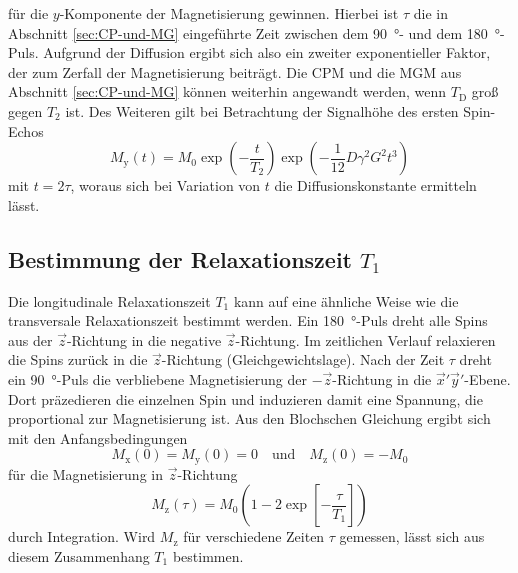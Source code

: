 für die $y$-Komponente der Magnetisierung gewinnen.
Hierbei ist $\tau$ die in Abschnitt \ref{sec:CP-und-MG} eingeführte Zeit zwischen
dem \SI{90}{\degree}- und dem \SI{180}{\degree}-Puls.
Aufgrund der Diffusion ergibt sich also ein zweiter exponentieller Faktor, der
zum Zerfall der Magnetisierung beiträgt.
Die CPM und die MGM aus Abschnitt \ref{sec:CP-und-MG} können weiterhin
angewandt werden, wenn $T_\text{D}$ groß gegen $T_2$ ist.
Des Weiteren gilt bei Betrachtung der Signalhöhe des ersten Spin-Echos
\begin{equation}
  M_\text{y}\!\left(t\right) = M_0
  \exp\!\left(-\frac{t}{T_2}\right)
  \exp\!\left(-\frac{1}{12} D \gamma^2 G^2 t^3\right)
  \label{eqn:DiffusionsBestimmung}
\end{equation}
mit $t = 2\tau$,
woraus sich bei Variation von $t$ die Diffusionskonstante ermitteln lässt.


\subsection{Bestimmung der Relaxationszeit \texorpdfstring{$T_1$}{T1}}
\label{sec:T1Theo}

Die longitudinale Relaxationszeit $T_1$ kann auf eine ähnliche Weise wie die
transversale Relaxationszeit bestimmt werden.
Ein \SI{180}{\degree}-Puls dreht alle Spins aus der $\vec{z}$-Richtung in
die negative $\vec{z}$-Richtung. Im zeitlichen Verlauf relaxieren die Spins zurück
in die $\vec{z}$-Richtung (Gleichgewichtslage).
Nach der Zeit $\tau$ dreht ein \SI{90}{\degree}-Puls die verbliebene Magnetisierung
der $-\vec{z}$-Richtung in die $\vec{x}'\vec{y}'$-Ebene.
Dort präzedieren die einzelnen Spin und induzieren damit eine Spannung, die
proportional zur Magnetisierung ist.
Aus den Blochschen Gleichung ergibt sich mit den Anfangsbedingungen
\begin{equation*}
  M_\text{x}\!\left(0\right) = M_\text{y}\!\left(0\right) = 0
  \quad \text{und} \quad M_\text{z}\!\left(0\right) = -M_0
\end{equation*}
für die Magnetisierung in $\vec{z}$-Richtung
\begin{equation}
  M_\text{z}\!\left(\tau\right) =
  M_0 \left(1 - 2 \exp\!\left[-\frac{\tau}{T_1}\right]\right)
  \label{eqn:T1-Vermessung}
\end{equation}
durch Integration.
Wird $M_\text{z}$ für verschiedene Zeiten $\tau$ gemessen, lässt sich aus diesem
Zusammenhang $T_1$ bestimmen.
